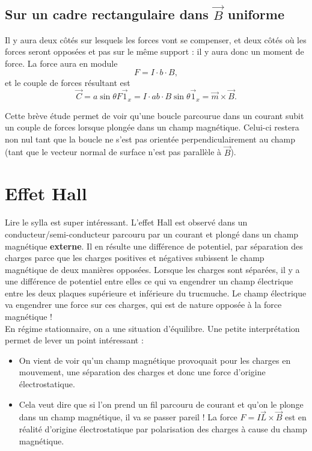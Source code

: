 \documentclass[12pt]{book}
\begin{document}
\subsection{Sur un cadre rectangulaire dans $\vec{B}$ uniforme}
Il y aura deux côtés sur lesquels les forces vont se compenser, et deux côtés où les forces seront opposées et pas sur le même support : il y aura donc un moment de force. La force aura en module $$F = I \cdot b \cdot B,$$
et le couple de forces résultant est 
$$\vec{C} = a\sin \theta F \vec{1}_x = I \cdot ab \cdot B\sin\theta \vec{1}_x = \vec{m}\times \vec{B}.$$

Cette brève étude permet de voir qu'une boucle parcourue dans un courant subit un couple de forces lorsque plongée dans un champ magnétique. Celui-ci restera non nul tant que la boucle ne s'est pas orientée perpendiculairement au champ (tant que le vecteur normal de surface n'est pas parallèle à $\vec{B}$).


\section{Effet Hall}
Lire le sylla est super intéressant. L'effet Hall est observé dans un conducteur/semi-conducteur parcouru par un courant et plongé dans un champ magnétique \textbf{externe}. Il en résulte une différence de potentiel, par séparation des charges parce que les charges positives et négatives subissent le champ magnétique de deux manières opposées. Lorsque les charges sont séparées, il y a une différence de potentiel entre elles ce qui va engendrer un champ électrique entre les deux plaques supérieure et inférieure du trucmuche. Le champ électrique va engendrer une force sur ces charges, qui est de nature opposée à la force magnétique ! \\

En régime stationnaire, on a une situation d'équilibre. Une petite interprétation permet de lever un point intéressant :

\begin{itemize}
\item On vient de voir qu'un champ magnétique provoquait pour les charges en mouvement, une séparation des charges et donc une force d'origine électrostatique.

\item Cela veut dire que si l'on prend un fil parcouru de courant et qu'on le plonge dans un champ magnétique, il va se passer pareil ! La force $F = I \vec{L}\times \vec{B}$ est en réalité d'origine électrostatique par polarisation des charges à cause du champ magnétique.
\end{itemize}
\end{document}
